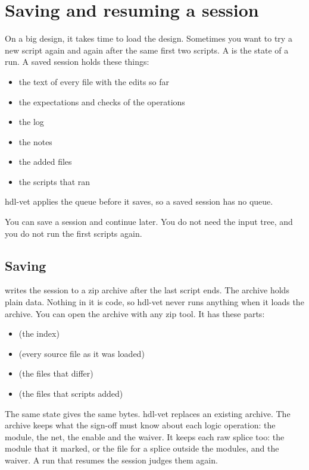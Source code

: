 \chapter{Saving and resuming a session}
\label{ch:session}

On a big design, it takes time to load the design. Sometimes you want to try a new script again and
again after the same first two scripts. A  is the state of a run. A saved
session holds these things:

\begin{itemize}
\item the text of every file with the edits so far
\item the expectations and checks of the operations
\item the log
\item the notes
\item the added files
\item the scripts that ran
\end{itemize}

hdl-vet applies the queue before it saves, so a saved session has no queue.

You can save a session and continue later. You do not need the input tree, and you do not
run the first scripts again.

\section{Saving}

  writes the session to a zip archive after the last script ends.
The archive holds plain data. Nothing in it is code, so hdl-vet never runs anything when
it loads the archive. You can open the archive with any zip tool. It has these parts:

\begin{itemize}
\item {} (the index)
\item {} (every source file as it was loaded)
\item {} (the files that differ)
\item {} (the files that scripts added)
\end{itemize}

The same state gives the same bytes. hdl-vet replaces an existing archive. The archive
keeps what the sign-off must know about each logic operation: the module, the net, the
enable and the waiver. It keeps each raw splice too: the module that it marked, or the file
for a splice outside the modules, and the waiver. A run that resumes the session judges
them again.

